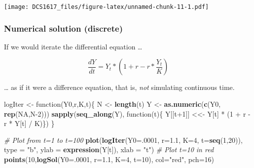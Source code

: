 \documentclass[]{book}
\newenvironment{Shaded}{\begin{snugshade}}{\end{snugshade}}
\newcommand{\KeywordTok}[1]{\textcolor[rgb]{0.13,0.29,0.53}{\textbf{{#1}}}}
\newcommand{\DataTypeTok}[1]{\textcolor[rgb]{0.13,0.29,0.53}{{#1}}}
\newcommand{\DecValTok}[1]{\textcolor[rgb]{0.00,0.00,0.81}{{#1}}}
\newcommand{\FloatTok}[1]{\textcolor[rgb]{0.00,0.00,0.81}{{#1}}}
\newcommand{\StringTok}[1]{\textcolor[rgb]{0.31,0.60,0.02}{{#1}}}
\newcommand{\CommentTok}[1]{\textcolor[rgb]{0.56,0.35,0.01}{\textit{{#1}}}}
\newcommand{\OtherTok}[1]{\textcolor[rgb]{0.56,0.35,0.01}{{#1}}}
\newcommand{\NormalTok}[1]{{#1}}
\begin{document}
\texttt{[image: DCS1617\_files/figure-latex/unnamed-chunk-11-1.pdf]}

\subsubsection*{Numerical solution
(discrete)}\label{numerical-solution-discrete}

If we would iterate the differential equation \ldots{}

\[
\frac{dY}{dt} = Y_t * (1 + r - r * \frac{Y_t}{K})
\]

\ldots{} as if it were a difference equation, that is, \emph{not}
simulating continuous time.

\begin{Shaded}
\begin{Highlighting}[]
\NormalTok{logIter <-}\StringTok{  }\NormalTok{function(Y0,r,K,t)\{}
  \NormalTok{N <-}\StringTok{ }\KeywordTok{length}\NormalTok{(t)}
  \NormalTok{Y <-}\StringTok{ }\KeywordTok{as.numeric}\NormalTok{(}\KeywordTok{c}\NormalTok{(Y0, }\KeywordTok{rep}\NormalTok{(}\OtherTok{NA}\NormalTok{,N}\DecValTok{-2}\NormalTok{)))}
  \KeywordTok{sapply}\NormalTok{(}\KeywordTok{seq_along}\NormalTok{(Y), function(t)\{ Y[[t}\DecValTok{+1}\NormalTok{]] <<-}\StringTok{ }\NormalTok{Y[t] *}\StringTok{ }\NormalTok{(}\DecValTok{1} \NormalTok{+}\StringTok{ }\NormalTok{r -}\StringTok{ }\NormalTok{r *}\StringTok{ }\NormalTok{Y[t] /}\StringTok{ }\NormalTok{K)\})}
  \NormalTok{\}}

\CommentTok{# Plot from t=1 to t=100}
\KeywordTok{plot}\NormalTok{(}\KeywordTok{logIter}\NormalTok{(}\DataTypeTok{Y0=}\NormalTok{.}\DecValTok{0001}\NormalTok{, }\DataTypeTok{r=}\FloatTok{1.1}\NormalTok{, }\DataTypeTok{K=}\DecValTok{4}\NormalTok{, }\DataTypeTok{t=}\KeywordTok{seq}\NormalTok{(}\DecValTok{1}\NormalTok{,}\DecValTok{20}\NormalTok{)), }\DataTypeTok{type =} \StringTok{"b"}\NormalTok{, }
     \DataTypeTok{ylab =} \KeywordTok{expression}\NormalTok{(Y[t]), }\DataTypeTok{xlab =} \StringTok{"t"}\NormalTok{)}
\CommentTok{# Plot t=10 in red}
\KeywordTok{points}\NormalTok{(}\DecValTok{10}\NormalTok{,}\KeywordTok{logSol}\NormalTok{(}\DataTypeTok{Y0=}\NormalTok{.}\DecValTok{0001}\NormalTok{, }\DataTypeTok{r=}\FloatTok{1.1}\NormalTok{, }\DataTypeTok{K=}\DecValTok{4}\NormalTok{, }\DataTypeTok{t=}\DecValTok{10}\NormalTok{), }\DataTypeTok{col=}\StringTok{"red"}\NormalTok{, }\DataTypeTok{pch=}\DecValTok{16}\NormalTok{)}
\end{Highlighting}
\end{Shaded}
\end{document}

